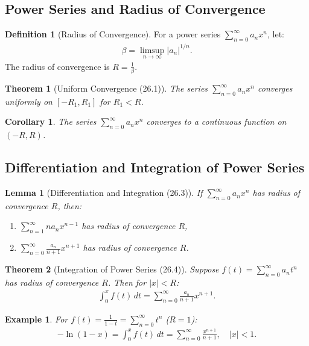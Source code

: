 \documentclass[9pt]{article}
\theoremstyle{definition}
\newtheorem{definition}{Definition}
\theoremstyle{plain}
\newtheorem{theorem}{Theorem}
\newtheorem{example}{Example}
\newtheorem{corollary}{Corollary}
\newtheorem{lemma}{Lemma}
\begin{document}
\subsection*{Power Series and Radius of Convergence}
\begin{definition}[Radius of Convergence]
For a power series $ \sum_{n=0}^\infty a_n x^n $, let:
\begin{align}
\beta = \limsup_{n \to \infty} |a_n|^{1/n}.
\end{align}
The radius of convergence is $ R = \frac{1}{\beta} $.
\end{definition}

\begin{theorem}[Uniform Convergence (26.1)]
The series $ \sum_{n=0}^\infty a_n x^n $ converges uniformly on $ [-R_1, R_1] $ for $ R_1 < R $.
\end{theorem}

\begin{corollary}
The series $ \sum_{n=0}^\infty a_n x^n $ converges to a continuous function on $ (-R, R) $.
\end{corollary}

\subsection*{Differentiation and Integration of Power Series}
\begin{lemma}[Differentiation and Integration (26.3)]
If $ \sum_{n=0}^\infty a_n x^n $ has radius of convergence $ R $, then:
\begin{enumerate}
    \item $ \sum_{n=1}^\infty n a_n x^{n-1} $ has radius of convergence $ R $,
    \item $ \sum_{n=0}^\infty \frac{a_n}{n+1} x^{n+1} $ has radius of convergence $ R $.
\end{enumerate}
\end{lemma}

\begin{theorem}[Integration of Power Series (26.4)]
Suppose $ f(t) = \sum_{n=0}^\infty a_n t^n $ has radius of convergence $ R $. Then for $ |x| < R $:
\begin{align}
\int_0^x f(t) \, dt = \sum_{n=0}^\infty \frac{a_n}{n+1} x^{n+1}.
\end{align}
\end{theorem}

\begin{example}
For $ f(t) = \frac{1}{1-t} = \sum_{n=0}^\infty t^n $ ($ R = 1 $):
\begin{align}
-\ln(1-x) = \int_0^x f(t) \, dt = \sum_{n=0}^\infty \frac{x^{n+1}}{n+1}, \quad |x| < 1.
\end{align}
\end{example}
\end{document}
